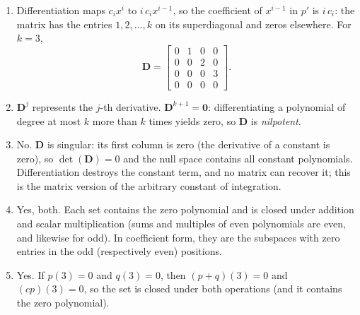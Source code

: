 \begin{solution}
    \begin{enumerate}[label=(\alph*)]
        \item Differentiation maps $c_i x^i$ to $i\, c_i x^{i-1}$, so the coefficient of $x^{i-1}$ in $p'$ is $i\, c_i$: the matrix has the entries $1, 2, \dots, k$ on its superdiagonal and zeros elsewhere. For $k = 3$,
        \begin{equation*}
            \mathbf{D} = \begin{bmatrix} 0 & 1 & 0 & 0 \\ 0 & 0 & 2 & 0 \\ 0 & 0 & 0 & 3 \\ 0 & 0 & 0 & 0 \end{bmatrix}.
        \end{equation*}
        \item $\mathbf{D}^j$ represents the $j$-th derivative. $\mathbf{D}^{k+1} = \mathbf{0}$: differentiating a polynomial of degree at most $k$ more than $k$ times yields zero, so $\mathbf{D}$ is \emph{nilpotent}.
        \item No. $\mathbf{D}$ is singular: its first column is zero (the derivative of a constant is zero), so $\det(\mathbf{D}) = 0$ and the null space contains all constant polynomials. Differentiation destroys the constant term, and no matrix can recover it; this is the matrix version of the arbitrary constant of integration.
        \item Yes, both. Each set contains the zero polynomial and is closed under addition and scalar multiplication (sums and multiples of even polynomials are even, and likewise for odd). In coefficient form, they are the subspaces with zero entries in the odd (respectively even) positions.
        \item Yes. If $p(3) = 0$ and $q(3) = 0$, then $(p + q)(3) = 0$ and $(cp)(3) = 0$, so the set is closed under both operations (and it contains the zero polynomial).
    \end{enumerate}
\end{solution}

